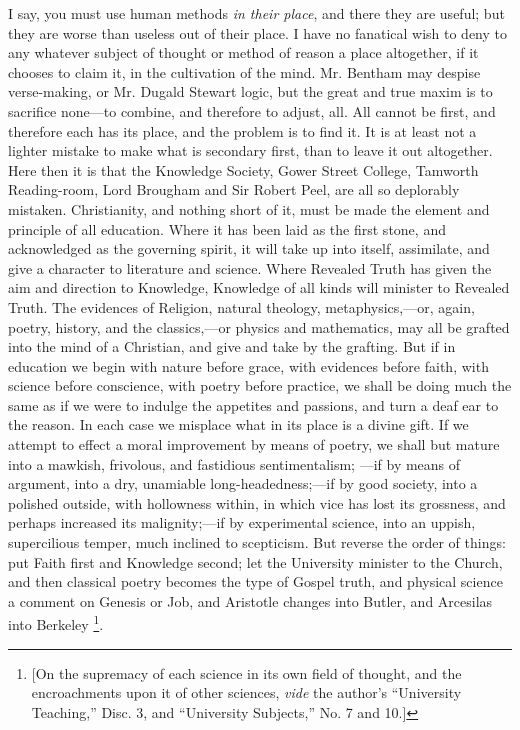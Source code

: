 I say, you must use human methods \emph{in their place}, and there
they are useful; but they are worse than useless out of their place. I
have no fanatical wish to deny to any whatever subject of thought or
method of reason a place altogether, if it chooses to claim it, in the
cultivation of the mind. Mr. Bentham may despise verse-making, or Mr.
Dugald Stewart logic, but the great and true maxim is to sacrifice
none—to combine, and therefore to adjust, all. All cannot be first,
and therefore each has its place, and the problem is to find it. It is
at least not a lighter mistake to make what is secondary first, than
to leave it out altogether. Here then it is that the Knowledge
Society, Gower Street College, Tamworth Reading-room, Lord Brougham
and Sir Robert Peel, are all so deplorably mistaken. Christianity, and
nothing short of it, must be made the element and principle of all
education. Where it has been laid as the first stone, and acknowledged
as the governing spirit, it will take up into itself, assimilate, and
give a character to literature and science. Where Revealed Truth has
given the aim and direction to Knowledge, Knowledge of all kinds will
minister to Revealed Truth. The evidences of Religion, natural
theology, metaphysics,—or, again, poetry, history, and the classics,—or
physics and mathematics, may all be grafted into the mind of a
Christian, and give and take by the grafting. But if in education we
begin with nature before grace, with evidences before faith, with
science before conscience, with poetry before practice, we shall be
doing much the same as if we were to indulge the appetites and
passions, and turn a deaf ear to the reason. In each case we misplace
what in its place is a divine gift. If we attempt to effect a moral
improvement by means of poetry, we shall but mature into a mawkish,
frivolous, and fastidious sentimentalism; —if by means of argument,
into a dry, unamiable long-headedness;—if by good society, into a
polished outside, with hollowness within, in which vice has lost its
grossness, and perhaps increased its malignity;—if by experimental
science, into an uppish, supercilious temper, much inclined to
scepticism. But reverse the order of things: put Faith first and
Knowledge second; let the University minister to the Church, and then
classical poetry becomes the type of Gospel truth, and physical
science a comment on Genesis or Job, and Aristotle changes into
Butler, and Arcesilas into Berkeley \footnote{[On the supremacy of each science in its own field of thought, and
the encroachments upon it of other sciences, \emph{vide} the author's
``University Teaching,'' Disc.
3, and ``University
Subjects,'' No. 7 and 10.]}.

